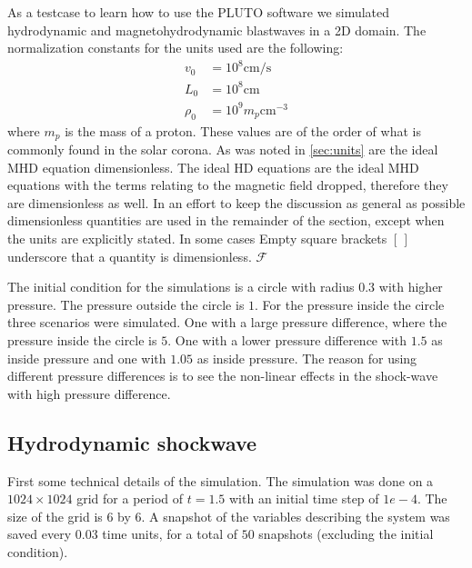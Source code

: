 As a testcase to learn how to use the PLUTO software we simulated hydrodynamic and magnetohydrodynamic blastwaves in a 2D domain.
The normalization constants for the units used are the following:
\begin{align*}
	v_0 &= 10^8 \text{cm/s}\\
	L_0 &= 10^8 \text{cm}\\
	\rho_0 &= 10^9 m_p \text{cm}^{-3}
\end{align*}
where $m_p$ is the mass of a proton. These values are of the order of what is commonly found in the solar corona. 
As was noted in \cref{sec:units} are the ideal MHD equation dimensionless.
The ideal HD equations are the ideal MHD equations with the terms relating to the magnetic field dropped, therefore they are dimensionless as well.
In an effort to keep the discussion as general as possible dimensionless quantities are used in the remainder of the section, except when the units are explicitly stated.
In some cases Empty square brackets $[\,]$ underscore that a quantity is dimensionless.
$\mathscr{F}$

The initial condition for the simulations is a circle with radius $0.3$ with higher pressure.
The pressure outside the circle is $1$. For the pressure inside the circle three scenarios were simulated.
One with a large pressure difference, where the pressure inside the circle is $5$. One with a lower pressure difference with $1.5$ as inside pressure and one with $1.05$ as inside pressure.
The reason for using different pressure differences is to see the non-linear effects in the shock-wave with high pressure difference.

\subsection{Hydrodynamic shockwave}
First some technical details of the simulation.
The simulation was done on a $1024 \times 1024$ grid for a period of $t=1.5$ with an initial time step of $1e-4$.
The size of the grid is $6$ by $6$.
A snapshot of the variables describing the system was saved every $0.03$ time units, for a total of $50$ snapshots (excluding the initial condition).

